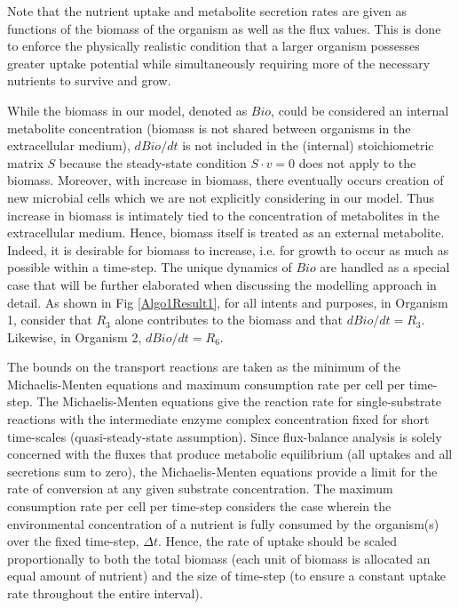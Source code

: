Note that the nutrient uptake and metabolite secretion rates are given as functions of the biomass of the organism as well as the flux values. This is done to enforce the physically realistic condition that a larger organism possesses greater uptake potential while simultaneously requiring more of the necessary nutrients to survive and grow.

While the biomass in our model, denoted as $Bio$, could be considered an internal metabolite concentration (biomass is not shared between organisms in the extracellular medium), $dBio / dt$ is not included in the (internal) stoichiometric matrix $S$ because the steady-state condition $S \cdot v = 0$ does not apply to the biomass. Moreover, with increase in biomass, there eventually occurs creation of new microbial cells which we are not explicitly considering in our model. Thus increase in biomass is intimately tied to the concentration of metabolites in the extracellular medium. Hence, biomass itself is treated as an external metabolite. Indeed, it is desirable for biomass to increase, i.e. for growth to occur as much as possible within a time-step. The unique dynamics of $Bio$ are handled as a special case that will be further elaborated when discussing the modelling approach in detail. As shown in Fig \ref{Algo1Result1}, for all intents and purposes, in Organism 1, consider that $R_3$ alone contributes to the biomass and that $dBio / dt = R_3$. Likewise, in Organism 2, $dBio / dt = R_6$.

The bounds on the transport reactions are taken as the minimum of the Michaelis-Menten equations and maximum consumption rate per cell per time-step\cite{Chiu14}.
The Michaelis-Menten equations give the reaction rate for single-substrate reactions with the intermediate enzyme complex concentration fixed for short time-scales (quasi-steady-state assumption). Since flux-balance analysis is solely concerned with the fluxes that produce metabolic equilibrium (all uptakes and all secretions sum to zero), the Michaelis-Menten equations provide a limit for the rate of conversion at any given substrate concentration. The maximum consumption rate per cell per time-step considers the case wherein the environmental concentration of a nutrient is fully consumed by the organism(s) over the fixed time-step, $\Delta t$. Hence, the rate of uptake should be scaled proportionally to both the total biomass (each unit of biomass is allocated an equal amount of nutrient) and the size of time-step (to ensure a constant uptake rate throughout the entire interval).

